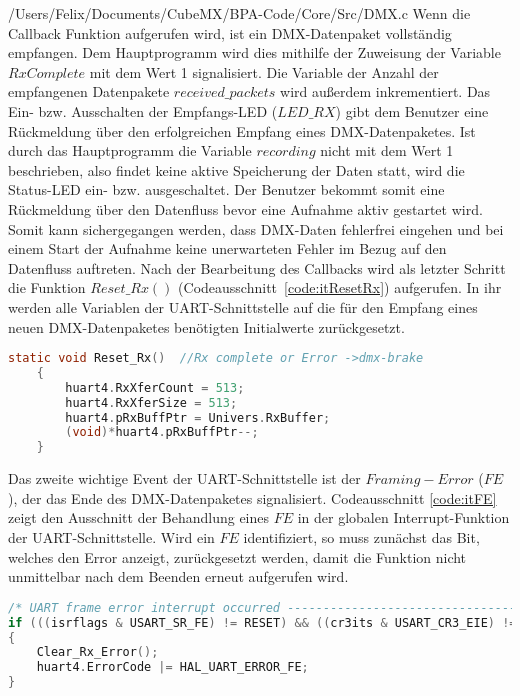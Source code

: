 
{/Users/Felix/Documents/CubeMX/BPA-Code/Core/Src/DMX.c}
Wenn die Callback Funktion aufgerufen wird, ist ein DMX-Datenpaket vollständig empfangen. Dem Hauptprogramm wird dies mithilfe der Zuweisung der Variable $RxComplete$ mit dem Wert 1 signalisiert. Die Variable der Anzahl der empfangenen Datenpakete $received\_packets$ wird außerdem inkrementiert. Das Ein- bzw. Ausschalten der Empfangs-LED ($LED\_RX$) gibt dem Benutzer eine Rückmeldung über den erfolgreichen Empfang eines DMX-Datenpaketes. Ist durch das Hauptprogramm die Variable $recording$ nicht mit dem  Wert 1 beschrieben, also findet keine aktive Speicherung der Daten statt, wird die Status-LED ein- bzw. ausgeschaltet. Der Benutzer bekommt somit eine Rückmeldung über den Datenfluss bevor eine Aufnahme aktiv gestartet wird. Somit kann sichergegangen werden, dass DMX-Daten fehlerfrei eingehen und bei einem Start der Aufnahme keine unerwarteten Fehler im Bezug auf den Datenfluss auftreten.
\newline
Nach der Bearbeitung des Callbacks wird als letzter Schritt die Funktion $Reset\_Rx()$ (Codeausschnitt \,\ref{code:itResetRx}) aufgerufen. In ihr werden alle Variablen der UART-Schnittstelle auf die für den Empfang eines neuen DMX-Datenpaketes benötigten Initialwerte zurückgesetzt.
\begin{lstlisting}[caption = stm32f4xx\_it.c: UART Reset\_Rx(),
	label = code:itResetRx, 
	language = C, 
	firstnumber = 434]
	static void Reset_Rx()	//Rx complete or Error ->dmx-brake
	{
		huart4.RxXferCount = 513;
		huart4.RxXferSize = 513;
		huart4.pRxBuffPtr = Univers.RxBuffer;
		(void)*huart4.pRxBuffPtr--;
	}
\end{lstlisting}
Das zweite wichtige Event der UART-Schnittstelle ist der $Framing-Error$ ($FE$), der das Ende des DMX-Datenpaketes signalisiert. Codeausschnitt \ref{code:itFE} zeigt den Ausschnitt der Behandlung eines $FE$ in der globalen Interrupt-Funktion der UART-Schnittstelle. Wird ein $FE$ identifiziert, so muss zunächst das Bit, welches den Error anzeigt, zurückgesetzt werden, damit die Funktion nicht unmittelbar nach dem Beenden erneut aufgerufen wird.
\begin{lstlisting}[caption = stm32f4xx\_it.c: UART Framing Error,
	label = code:itFE, 
	language = C, 
	firstnumber = 349]
/* UART frame error interrupt occurred -----------------------------------*/
if (((isrflags & USART_SR_FE) != RESET) && ((cr3its & USART_CR3_EIE) != RESET))
{
	Clear_Rx_Error();
	huart4.ErrorCode |= HAL_UART_ERROR_FE;
}
\end{lstlisting}
